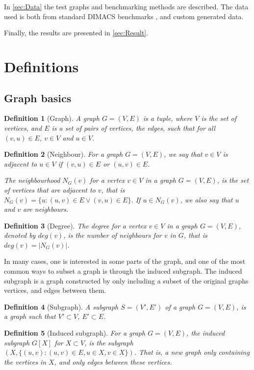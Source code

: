 \documentclass{amsart}
\newtheorem{definition}{Definition}[section]
\begin{document}
In \autoref{sec:Data} the test graphs and benchmarking methods are described. The data
used is both from standard DIMACS benchmarks \cite{DIMACS}, and custom generated data.

Finally, the results are presented in \autoref{sec:Result}.

\section{Definitions}
\label{sec:Definitions}

\subsection{Graph basics}
\label{sec:GraphBasics}

\begin{definition}[Graph]
    A graph $G = (V,E)$ is a tuple, where $V$ is the set of vertices, and $E$ is
    a set of pairs of vertices, the edges, such that for all $(v,u) \in E$,
    $v \in V$ and $u \in V$.
\end{definition}
\begin{definition}[Neighbour]
    For a graph $G = (V,E)$, we say that $v \in V$ is adjacent to 
    $u \in V$ if $(v,u) \in E$ or $(u,v) \in E$. 

    The neighbourhood $N_G(v)$ for a vertex $v \in V$ in a graph $G = (V,E)$,
    is the set of vertices that are adjacent to $v$, that is 
    $N_G(v) = \{u : (u,v) \in E \vee (v,u) \in E\}$. If $u \in N_G(v)$, we also say
    that $u$ and $v$ are neighbours.
\end{definition}
\begin{definition}[Degree]
    The degree for a vertex $v \in V$ in a graph $G = (V,E)$, denoted by 
    $deg(v)$, is the number of neighbours for $v$ in $G$, that is 
    $deg(v) = |N_G(v)|$.
\end{definition}

In many cases, one is interested in some parts of the graph, and one of the
most common ways to subset a graph is through the induced subgraph. The induced
subgraph is a graph constructed by only including a subset of the original
graphs vertices, and edges between them.

\begin{definition}[Subgraph]
    A subgraph $S = (V',E')$ of a graph $G = (V,E)$, is a graph such that
    $V' \subset V$, $E' \subset E$.
\end{definition}

\begin{definition}[Induced subgraph]
    
    For a graph $G = (V,E)$, the induced subgraph $G[X]$ for $X \subset V$, is
    the subgraph $(X,\{(u,v) : (u,v) \in E, u \in X,v \in X\})$. That
    is, a new graph only containing the vertices in $X$, and only edges between
    these vertices.

\end{definition}
\end{document}
